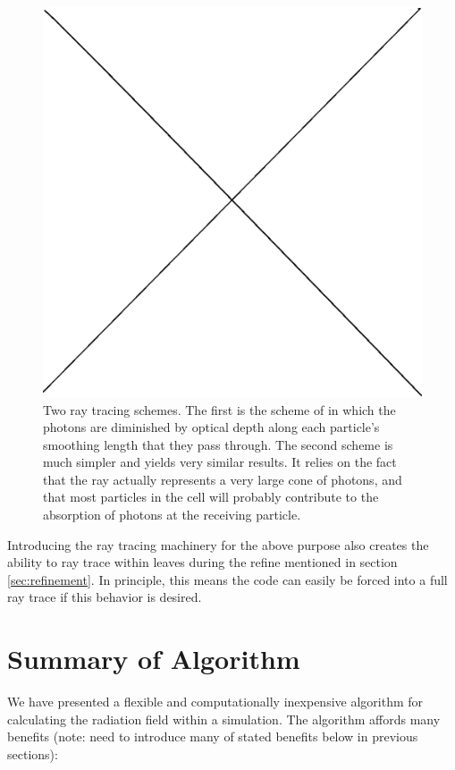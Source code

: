 \begin{figure}
\includegraphics[width=\textwidth]{graphics/placeholder.eps}
\caption[Ray tracing schemes for receiving cells.]{Two ray tracing schemes. The first is the scheme of \citet{altayCroftPelupessi08} in which the photons are diminished by optical depth along each particle's smoothing length that they pass through. The second scheme is much simpler and yields very similar results. It relies on the fact that the ray actually represents a very large cone of photons, and that most particles in the cell will probably contribute to the absorption of photons at the receiving particle.}
\label{fig:raytracing}
\end{figure}

Introducing the ray tracing machinery for the above purpose also creates the ability to ray trace within leaves during the refine mentioned in section \ref{sec:refinement}. In principle, this means the code can easily be forced into a full ray trace if this behavior is desired.

\section{Summary of Algorithm}
\label{sec:algorithmsummary}

We have presented a flexible and computationally inexpensive algorithm for calculating the radiation field within a simulation. The algorithm affords many benefits (note: need to introduce many of stated benefits below in previous sections):

